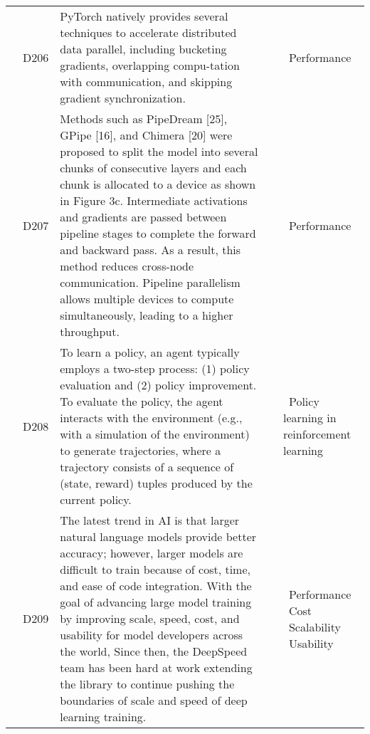 {\begin{longtable}[H]{|l|p{0.6cm}|p{11.8cm}|p{0.6cm}|p{2cm}|}
         & \label{D206}D206\newline\centering\cite{li_pytorch_2020} & PyTorch natively provides several techniques to accelerate distributed data parallel, including bucketing gradients, overlapping compu-tation with communication, and skipping gradient synchronization.
         & \cite{li_pytorch_2020,li_colossal-ai_2023,rasley_deepspeed_2020,shoeybi_megatron-lm_2020}
	     & \textbullet\ Performance \\ \cline{2-5}

         & \label{D207}D207\newline\centering\cite{li_colossal-ai_2023} & Methods such as PipeDream [25], GPipe [16], and Chimera [20] were proposed to split the model into several chunks of consecutive layers and each chunk is allocated to a device as shown in Figure 3c. Intermediate activations and gradients are passed between pipeline stages to complete the forward and backward pass. As a result, this method reduces cross-node communication. Pipeline parallelism allows multiple devices to compute simultaneously, leading to a higher throughput.
         & \cite{li_pytorch_2020,li_colossal-ai_2023,rasley_deepspeed_2020,shoeybi_megatron-lm_2020}
	     & \textbullet\ Performance \\ \cline{2-5}

         & \label{D208}D208\newline\centering\cite{moritz_ray_2018} & To learn a policy, an agent typically employs a two-step process: (1) policy evaluation and (2) policy improvement. To evaluate the policy, the agent interacts with the environment (e.g., with a simulation of the environment) to generate trajectories, where a trajectory consists of a sequence of (state, reward) tuples produced by the current policy.
         & \cite{moritz_ray_2018}
	     & \textbullet\ Policy learning in reinforcement learning \\ \cline{2-5}

         & \label{D209}D209\newline\centering\cite{rasley_deepspeed_2020} & The latest trend in AI is that larger natural language models provide better accuracy; however, larger models are difficult to train because of cost, time, and ease of code integration. With the goal of advancing large model training by improving scale, speed, cost, and usability for model developers across the world, Since then, the DeepSpeed team has been hard at work extending the library to continue pushing the boundaries of scale and speed of deep learning training.
         & \cite{rasley_deepspeed_2020,huang_gpipe_2019,shoeybi_megatron-lm_2020}
	     & \textbullet\ Performance \newline \textbullet\ Cost \newline \textbullet\ Scalability \newline \textbullet\ Usability \\ \cline{2-5}


\end{longtable}}
